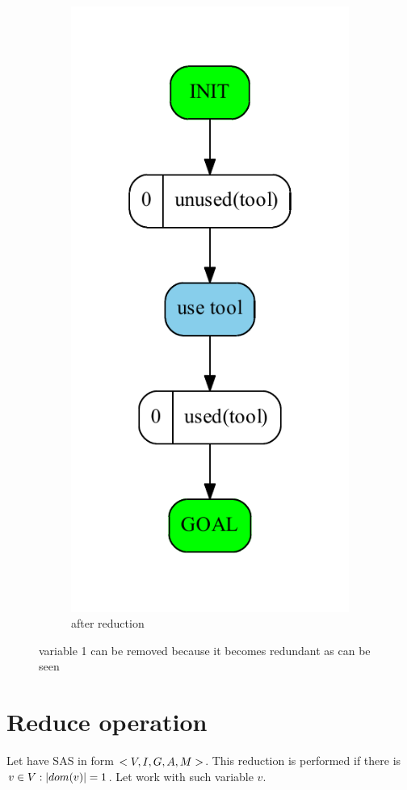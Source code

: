 \begin{figure}
\begin{subfigure}[b]{0.4\textwidth}
			\includegraphics[scale=0.4]{deleteVariable/figures/simple_output}
			\caption{after reduction}
		\end{subfigure}
		\caption{variable 1 can be removed because it becomes redundant as can be seen}
	\end{figure}
	
	
	\section{Reduce operation}
	Let have SAS in form $<V, I, G, A, M{}>$. This reduction is performed if there is $v \in V: |dom(v)| = 1$. Let work with such variable $v$.
	
